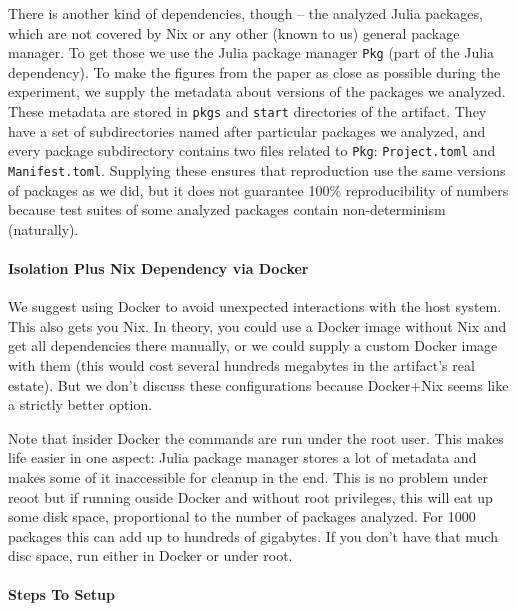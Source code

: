 \documentclass[
]{article}
\begin{document}
There is another kind of dependencies, though -- the analyzed Julia
packages, which are not covered by Nix or any other (known to us)
general package manager. To get those we use the Julia package manager
\texttt{Pkg} (part of the Julia dependency). To make the figures from
the paper as close as possible during the experiment, we supply the
metadata about versions of the packages we analyzed. These metadata are
stored in \texttt{pkgs} and \texttt{start} directories of the artifact.
They have a set of subdirectories named after particular packages we
analyzed, and every package subdirectory contains two files related to
\texttt{Pkg}: \texttt{Project.toml} and \texttt{Manifest.toml}.
Supplying these ensures that reproduction use the same versions of
packages as we did, but it does not guarantee 100\% reproducibility of
numbers because test suites of some analyzed packages contain
non-determinism (naturally).

\hypertarget{isolation-plus-nix-dependency-via-docker}{%
\paragraph{Isolation Plus Nix Dependency via
Docker}\label{isolation-plus-nix-dependency-via-docker}}

We suggest using Docker to avoid unexpected interactions with the host
system. This also gets you Nix. In theory, you could use a Docker image
without Nix and get all dependencies there manually, or we could supply
a custom Docker image with them (this would cost several hundreds
megabytes in the artifact's real estate). But we don't discuss these
configurations because Docker+Nix seems like a strictly better option.

Note that insider Docker the commands are run under the root user. This
makes life easier in one aspect: Julia package manager stores a lot of
metadata and makes some of it inaccessible for cleanup in the end. This
is no problem under reoot but if running ouside Docker and without root
privileges, this will eat up some disk space, proportional to the number
of packages analyzed. For 1000 packages this can add up to hundreds of
gigabytes. If you don't have that much disc space, run either in Docker
or under root.

\hypertarget{steps-to-setup}{%
\paragraph{Steps To Setup}\label{steps-to-setup}}
\end{document}
